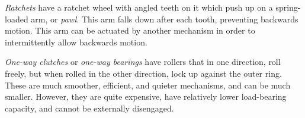 \documentclass[10pt,letterpaper]{book}
\begin{document}
\begin{asparaenum}[a)]
	\item \textit{Ratchets} have a ratchet wheel with angled teeth on it which push up on a spring-loaded arm, or \textit{pawl}. This arm falls down after each tooth, preventing backwards motion. This arm can be actuated by another mechanism in order to intermittently allow backwards motion.
	\item \textit{One-way clutches} or \textit{one-way bearings} have rollers that in one direction, roll freely, but when rolled in the other direction, lock up against the outer ring. These are much smoother, efficient, and quieter mechanisms, and can be much smaller. However, they are quite expensive, have relatively lower load-bearing capacity, and cannot be externally disengaged.
\end{asparaenum}
\end{document}
